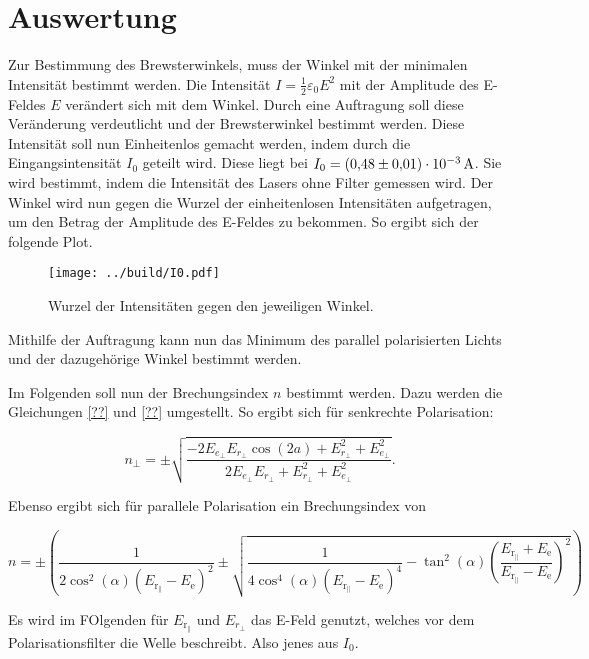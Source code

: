


\section{Auswertung}
\label{sec:Auswertung}

Zur Bestimmung des Brewsterwinkels, muss der Winkel mit der minimalen Intensität bestimmt werden. 
Die Intensität $I=\frac1 2 \varepsilon_0 E^2$ mit der Amplitude des E-Feldes $E$ verändert sich mit dem Winkel. 
Durch eine Auftragung soll diese Veränderung verdeutlicht und der Brewsterwinkel bestimmt werden. 
Diese Intensität soll nun Einheitenlos gemacht werden, indem durch die Eingangsintensität $I_0$ geteilt wird. 
Diese liegt bei $I_0=\qty{0.48\pm0.01e-3}{\ampere}$. Sie wird bestimmt, indem die Intensität des Lasers ohne 
Filter gemessen wird. 
Der Winkel wird nun gegen die Wurzel der einheitenlosen Intensitäten aufgetragen, um den Betrag der Amplitude des E-Feldes zu bekommen. 
So ergibt sich der folgende Plot.

\begin{figure}
    \texttt{[image: ../build/I0.pdf]}
    \caption{Wurzel der Intensitäten gegen den jeweiligen Winkel.}
\end{figure}

\noindent Mithilfe der Auftragung kann nun das Minimum des parallel polarisierten Lichts und der dazugehörige Winkel bestimmt werden.  

Im Folgenden soll nun der Brechungsindex $n$ bestimmt werden. Dazu werden die Gleichungen \eqref{??} und \eqref{??} umgestellt. 
So ergibt sich für senkrechte Polarisation:

\begin{equation}
    n_\bot = \pm\sqrt{\frac{-2 E_{e_\bot} E_{r_\bot} \cos{(2a)} + E_{r_\bot}^2 + E_{e_\bot}^2 }{ 2 E_{e_\bot} E_{r_\bot} + E_{r_\bot}^2 + E_{e_\bot}^2  }}.
\end{equation}

\noindent Ebenso ergibt sich für parallele Polarisation ein Brechungsindex von 

\begin{equation}
    n = \pm \left( \frac{1}{2 \cos^2(\alpha) (E_{\text{r}_\parallel} - E_\text{e})^2} \pm \sqrt{\frac{1}{4 \cos^4(\alpha) (E_{\text{r}_\parallel} - E_\text{e})^4} - \tan^2(\alpha) \left(\frac{E_{\text{r}_\parallel} + E_\text{e}}{E_{\text{r}_\parallel} - E_\text{e}} \right)^2} \right)
\end{equation}

\noindent Es wird im FOlgenden für $E_{\text{r}_\parallel}$ und $E_{r_\bot}$ das E-Feld genutzt, welches vor dem Polarisationsfilter die Welle beschreibt. Also jenes aus $I_0$.




